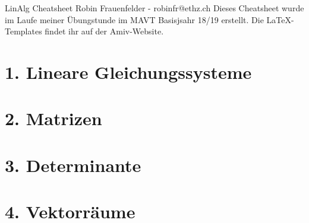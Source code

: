 






\begin{multicols*}{4}

\DocumentInfo
{LinAlg Cheatsheet} %
{Robin Frauenfelder - robinfr@ethz.ch} %
{Dieses Cheatsheet wurde im Laufe meiner Übungstunde im MAVT Basisjsahr 18/19 erstellt. Die \LaTeX -Templates findet ihr auf der Amiv-Website.} %
\WhiteSpace

\section{1. Lineare Gleichungssysteme}
\WhiteSpace
	
	
	
\section{2. Matrizen}
\WhiteSpace
	
	
	
	
	
	
	
	
	
	
\section{3. Determinante}
\WhiteSpace
	
	
	
	
	
\section{4. Vektorräume}
\WhiteSpace
	
	
	
	
	
	
	
	

\end{multicols*}
